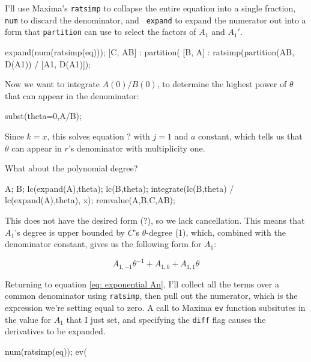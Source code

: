 I'll use Maxima's {\tt ratsimp} to collapse the entire equation into a
single fraction, {\tt num} to discard the denominator, and {\tt
expand} to expand the numerator out into a form that {\tt partition}
can use to select the factors of $A_1$ and $A_1'$.

\begin{maximablock}
expand(num(ratsimp(eq)));
[C, AB] : partition(%
[B, A] : ratsimp(partition(AB, D(A1))
          / [A1, D(A1)]);
\end{maximablock}

Now we want to integrate $A(0)/B(0)$, to determine the highest power
of $\theta$ that can appear in the denominator:

\begin{maximablock}
subst(theta=0,A/B);
\end{maximablock}

Since $k=x$, this solves equation ? with $j=1$ and $a$ constant,
which tells us that $\theta$ can appear in $r$'s denominator
with multiplicity one.

What about the polynomial degree?

\begin{maximablock}
A;
B;
lc(expand(A),theta);
lc(B,theta);
integrate(lc(B,theta) / lc(expand(A),theta), x);
remvalue(A,B,C,AB);
\end{maximablock}

This does not have the desired form (?), so we lack cancellation.
This means that $A_1$'s degree is upper bounded by
$C$'s $\theta$-degree (1), which, combined with the denominator constant,
gives us the following form for $A_1$:

$$A_{1,-1} \theta^{-1} + A_{1,0} + A_{1,1} \theta$$


Returning to equation \eqref{eq: exponential An}, I'll collect all the
terms over a common denominator using {\tt ratsimp}, then pull out the
numerator, which is the expression we're setting equal to zero.
A call to Maxima {\tt ev} function subsitutes in the value for
$A_1$ that I just set, and specifying the {\tt diff} flag causes
the derivatives to be expanded.

\begin{maximablock}
num(ratsimp(eq));
ev(%
\end{maximablock}

